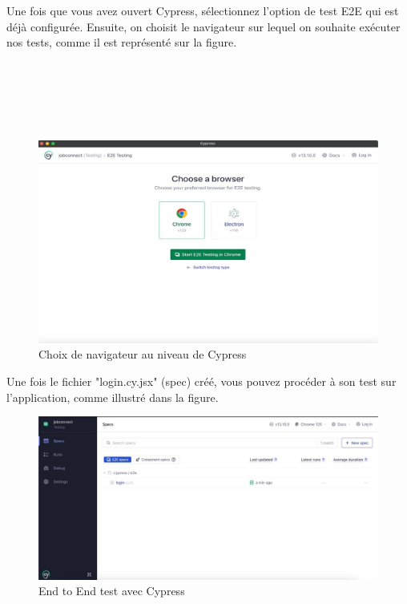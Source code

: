 Une fois que vous avez ouvert Cypress, sélectionnez l’option de test E2E qui est déjà configurée. Ensuite, on choisit le navigateur sur lequel on souhaite exécuter nos tests, comme il est représenté sur la figure.
\\
\\
\\
\\
\\
\\

\begin{figure}[htbp]
   \centering
   \includegraphics[scale=0.4]{cypress/3.jpg} 
   \caption{Choix de navigateur au niveau de Cypress}
   \label{fig:listOffers}
\end{figure}

Une fois le fichier "login.cy.jsx" (spec) créé, vous pouvez procéder à son test sur l'application, comme illustré dans la figure.
\newline

\begin{figure}[htbp]
   \centering
   \includegraphics[scale=0.4]{cypress/4.jpg} 
   \caption{ End to End test avec Cypress}
   \label{fig:listOffers}
\end{figure}

